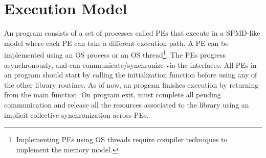 \section{Execution Model}
\label{subsec:execution_model}

An \openshmem{} program consists of a set of \openshmem{} processes called \ac{PE}s that execute in a \ac{SPMD}-like model where each \ac{PE} can take a different execution path. A \ac{PE} can be implemented using an OS process or an OS thread\footnote{\cbstart Implementing \ac{PE}s using OS threads require compiler techniques to implement the \openshmem{} memory model.\cbend}.
The \ac{PE}s progress asynchronously, and can communicate/synchronize 
via the \openshmem{} interfaces. All \ac{PE}s in an \openshmem{} program should start by calling the initialization function  before using any of the other \openshmem{} library routines. As of now, an \openshmem program finishes execution by returning from the main function. On program exit, \openshmem \cbstart must complete all pending communication and release all the resources associated to the library using an implicit collective synchronization across \ac{PE}s.\cbend

